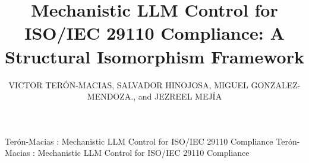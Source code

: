 \documentclass{ieeeaccess}
\begin{document}

\title{Mechanistic LLM Control for ISO/IEC 29110 Compliance: A Structural Isomorphism Framework}

\author{\uppercase{Victor Terón-Macias},
\uppercase{Salvador Hinojosa, Miguel Gonzalez-Mendoza}., and \uppercase{Jezreel Mejía } }
\address[1]{Tecnologico de Monterrey, Escuela de Ingeniería y Ciencias Boulder, Ave. Eugenio Garza Sada 2501 Sur, Col: Tecnológico, Monterrey, N.L., México, 64700. (e-mail: A00843371@tec.mx, salvador.hinojosa@tec.mx, mgonza@tec.mx)}
\address[2]{Centro de Investigación en Matemáticas Unidad Zacatecas, Departamento de Ingeniería de Software (e-mail: jmejia@cimat.mx)}


\markboth
{Terón-Macias \headeretal: Mechanistic LLM Control for ISO/IEC 29110 Compliance}
{Terón-Macias \headeretal: Mechanistic LLM Control for ISO/IEC 29110 Compliance}

\end{document}
